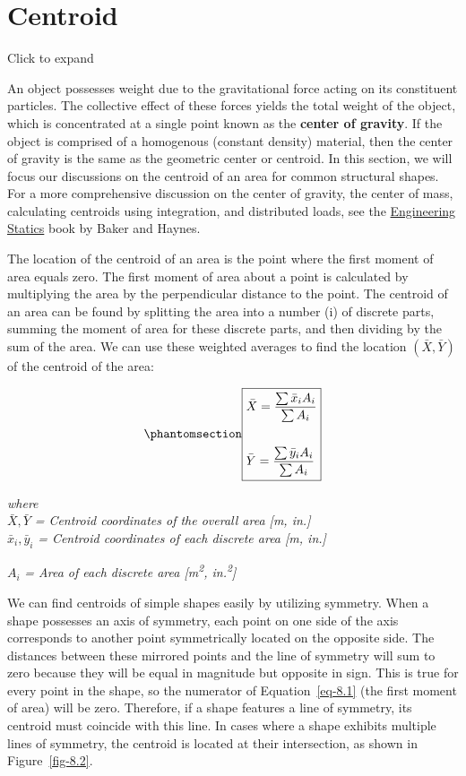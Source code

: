 \documentclass[
  letterpaper,
  DIV=11,
  numbers=noendperiod]{scrreprt}
\theoremstyle{definition}
\theoremstyle{remark}
\begin{document}
\section{Centroid}\label{sec-8.1}

Click to expand

An object possesses weight due to the gravitational force acting on its
constituent particles. The collective effect of these forces yields the
total weight of the object, which is concentrated at a single point
known as the \textbf{center of gravity}. If the object is comprised of a
homogenous (constant density) material, then the center of gravity is
the same as the geometric center or centroid. In this section, we will
focus our discussions on the centroid of an area for common structural
shapes. For a more comprehensive discussion on the center of gravity,
the center of mass, calculating centroids using integration, and
distributed loads, see the
\href{https://engineeringstatics.org/Chapter_07-center-of-mass.html}{Engineering
Statics} book by Baker and Haynes.

The location of the centroid of an area is the point where the first
moment of area equals zero. The first moment of area about a point is
calculated by multiplying the area by the perpendicular distance to the
point. The centroid of an area can be found by splitting the area into a
number (i) of discrete parts, summing the moment of area for these
discrete parts, and then dividing by the sum of the area. We can use
these weighted averages to find the location \((\bar{X}, \bar{Y})\) of
the centroid of the area:

\begin{equation}\phantomsection\label{eq-8.1}{
\boxed{\begin{aligned}
&\bar{X}=\frac{\sum \bar{x}_i A_i}{\sum A_i} \\
\\
&\bar{Y}=\frac{\sum \bar{y}_i A_i}{\sum A_i}
\end{aligned}}
}\end{equation}

\emph{where}\\
\(\bar{X}, \bar{Y}\) \emph{= Centroid coordinates of the overall area
{[}m, in.{]}}\\
\(\bar{x}_i, \bar{y}_i\) \emph{= Centroid coordinates of each discrete
area {[}m, in.{]}}

\(A_i\) \emph{= Area of each discrete area {[}m\textsuperscript{2},
in.\textsuperscript{2}{]}}

We can find centroids of simple shapes easily by utilizing symmetry.
When a shape possesses an axis of symmetry, each point on one side of
the axis corresponds to another point symmetrically located on the
opposite side. The distances between these mirrored points and the line
of symmetry will sum to zero because they will be equal in magnitude but
opposite in sign. This is true for every point in the shape, so the
numerator of Equation~\ref{eq-8.1} (the first moment of area) will be
zero. Therefore, if a shape features a line of symmetry, its centroid
must coincide with this line. In cases where a shape exhibits multiple
lines of symmetry, the centroid is located at their intersection, as
shown in Figure~\ref{fig-8.2}.
\end{document}
